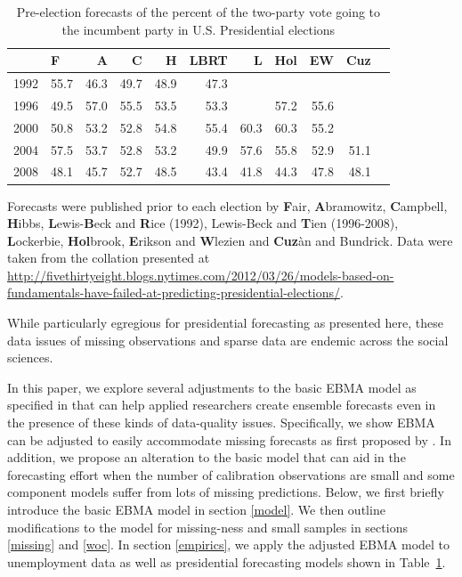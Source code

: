 \documentclass[12pt,fullpage,endnotes]{article}
\begin{document}
\begin{table}[ht]
\caption{Pre-election forecasts of the percent of the two-party vote going to the incumbent party in U.S. Presidential elections}
\label{tab:one}
\footnotesize
\begin{center}
\begin{tabular}{rlrrrrrrrrr}
  \toprule
  & F & A & C & H & LBRT & L & Hol & EW & Cuz \\ 
  \midrule
  1992 & 55.7 & 46.3 & 49.7 & 48.9 & 47.3 &  &  &  &  \\ 
  1996 & 49.5 & 57.0 & 55.5 & 53.5 & 53.3 &  & 57.2 & 55.6 &  \\ 
  2000 & 50.8 & 53.2 & 52.8 & 54.8 & 55.4 & 60.3 & 60.3 & 55.2 &  \\ 
  2004 & 57.5 & 53.7 & 52.8 & 53.2 & 49.9 & 57.6 & 55.8 & 52.9 & 51.1 \\ 
  2008 & 48.1 & 45.7 & 52.7 & 48.5 & 43.4 & 41.8 & 44.3 & 47.8 & 48.1 \\ 
  \bottomrule

\end{tabular}
\end{center}
Forecasts were published prior to each election by \textbf{F}air, \textbf{A}bramowitz, \textbf{C}ampbell, \textbf{H}ibbs, \textbf{L}ewis-\textbf{B}eck and \textbf{R}ice (1992), Lewis-Beck and \textbf{T}ien  (1996-2008),   \textbf{L}ockerbie, \textbf{Hol}brook, \textbf{E}rikson and \textbf{W}lezien and \textbf{Cuz}\`an and Bundrick.  Data were taken from the collation presented at \url{http://fivethirtyeight.blogs.nytimes.com/2012/03/26/models-based-on-fundamentals-have-failed-at-predicting-presidential-elections/}.
\end{table}

While particularly egregious for presidential forecasting as presented here, these data
issues of missing observations and sparse data are endemic across the social sciences.

In this paper, we explore several adjustments to the basic EBMA model
as specified in \citet{mhw:2012} that can help applied
researchers create ensemble forecasts even in the presence of these
kinds of data-quality issues.  Specifically, we show EBMA can be
adjusted to easily accommodate missing forecasts as first proposed by \citep{Fraley:2010}.  In addition, we
propose an alteration to the basic model that can aid in the forecasting effort when the number of calibration observations are small and some component models suffer from lots of missing predictions.  Below, we first briefly introduce
the basic EBMA model in section \ref{model}.  We then outline modifications
to the model for missing-ness and small samples in sections
\ref{missing} and \ref{woc}. In section \ref{empirics}, we apply the
adjusted EBMA model to unemployment data as well as presidential
forecasting models shown in Table~\ref{tab:one}.
\end{document}
